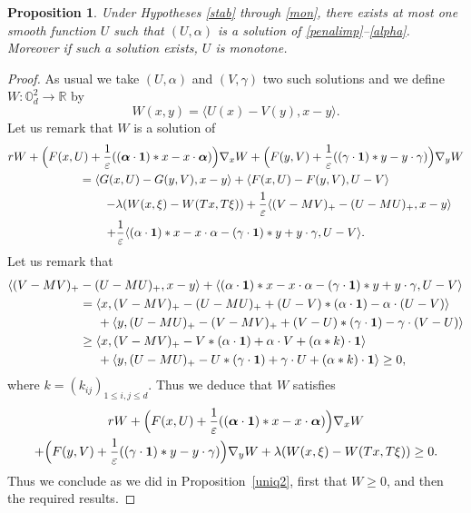 \documentclass[JEP,XML,SOM,Unicode,NoEqCountersInSection,published]{cedram}
\newcommand{\One}{\mathbf{1}}
\let\epsilon\varepsilon
\newtheorem{Prop}{Proposition}[section]
\theoremstyle{definition}
\begin{document}
\begin{Prop}
Under Hypotheses \ref{stab} through \ref{mon}, there exists at most one smooth function $U$ such that $(U,\alpha)$ is a solution of \eqref{penalimp}--\eqref{alpha}. Moreover if such a solution exists, $U$ is monotone.
\end{Prop}
\begin{proof}
As usual we take $(U,\alpha)$ and $(V, \gamma)$ two such solutions and we define \hbox{$W: \mathbb{O}_d^2 \to \mathbb{R}$} by
\begin{equation*}
W(x,y) = \langle U(x)- V(y), x-y\rangle.
\end{equation*}
Let us remark that $W$ is a solution of
\begin{multline*}
r W + \Bigl(F(x,U)+\frac{1}{\epsilon} ((\boldsymbol{\alpha}\cdot\One)* x-x\cdot \boldsymbol{\alpha}) \Bigr)\nabla_x W+\Bigl(F(y,V)+\frac{1}{\epsilon} ((\gamma\cdot\One)* y-y\cdot \gamma) \Bigr)\nabla_y W\\
= \langle G(x,U)-G(y,V), x-y \rangle+\langle F(x,U)-F(y,V), U-V \rangle\\
\shoveright{- \lambda (W(x,\xi)-W(Tx,T\xi))
+\frac{1}{\epsilon}\langle (V-MV)_+-(U- MU)_+, x-y \rangle}\\
+\frac{1}{\epsilon} \langle(\alpha\cdot\One)* x-x\cdot \alpha -(\gamma\cdot\One)* y +y\cdot \gamma, U-V \rangle.
\end{multline*}
Let us remark that
\begin{equation*}
\begin{aligned}
\langle (V-MV)_+&-(U- MU)_+, x-y \rangle+\langle (\alpha\cdot\One)* x-x\cdot \alpha -(\gamma\cdot\One)* y +y\cdot \gamma, U-V \rangle\\
&=\langle x, (V-MV)_+-(U- MU)_++(U- V)* (\alpha\cdot\One)-\alpha \cdot (U-V) \rangle\\
&\hspace*{.5cm}+\langle y, (U-MU)_+-(V- MV)_++(V- U)* (\gamma\cdot\One)-\gamma \cdot (V-U) \rangle\\
&\geq\langle x, (V-MV)_+-V* (\alpha\cdot\One)+\alpha \cdot V+(\alpha*k)\cdot\One \rangle\\
&\hspace*{.5cm}+\langle y, (U-MU)_+-U* (\gamma\cdot\One)+\gamma \cdot U+(\alpha*k)\cdot \One \rangle\geq 0,
\end{aligned}
\end{equation*}
where $k = (k_{ij})_{1\leq i,j\leq d}$. Thus we deduce that $W$ satisfies
\begin{multline*}
r W +\Bigl(F(x,U)+\frac{1}{\epsilon} ((\boldsymbol{\alpha}\cdot\One)* x-x\cdot \boldsymbol{\alpha}) \Bigr)\nabla_x W\\
+\Bigl(F(y,V)+\frac{1}{\epsilon} ((\gamma\cdot\One)* y-y\cdot \gamma) \Bigr)\nabla_y W
+ \lambda(W(x,\xi)-W(Tx,T\xi)) \geq 0.
\end{multline*}
Thus we conclude as we did in Proposition~\ref{uniq2}, first that $W \geq 0$, and then the required results.
\end{proof}
\end{document}
